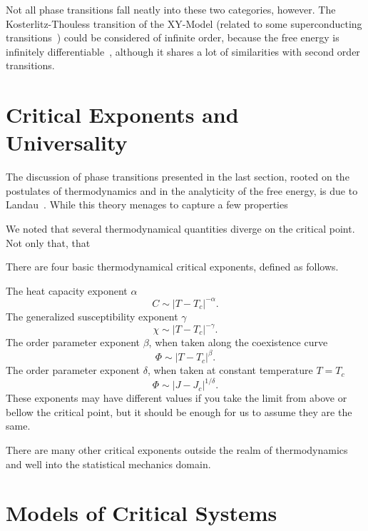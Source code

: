 Not all phase transitions fall neatly into these two categories, however. The
Kosterlitz-Thouless transition of the XY-Model (related to some superconducting
transitions~\cite{Resnick1981}) could be considered of infinite order, because
the free energy is infinitely differentiable~\cite{Kosterlitz1973}, although it
shares a lot of similarities with second order transitions.


\section{Critical Exponents and Universality}
\label{sec:universality}

The discussion of phase transitions presented in the last section, rooted on
the postulates of thermodynamics and in the analyticity of the free energy, is
due to Landau~\cite{Landau1969}. While this theory menages to capture a few
properties 

We noted that several thermodynamical quantities diverge on the critical point.
Not only that, that

There are four basic thermodynamical critical exponents, defined as follows.

The heat capacity exponent $\alpha$
\begin{equation}
    C \sim \left|T-T_c\right|^{-\alpha}.
\end{equation}
The generalized susceptibility exponent $\gamma$
\begin{equation}
    \chi \sim \left|T-T_c\right|^{-\gamma}.
\end{equation}
The order parameter exponent $\beta$, when taken along the coexistence curve 
\begin{equation}
    \Phi \sim {\left|T-T_c\right|}^{\beta}.
\end{equation}
The order parameter exponent $\delta$, when taken at constant temperature
$T=T_c$
\begin{equation}
    \Phi \sim \left|J-J_c\right|^{1/\delta}.
\end{equation}
These exponents may have different values if you take the limit from above or
bellow the critical point, but it should be enough for us to assume they are
the same.

There are many other critical exponents outside the realm of thermodynamics and
well into the statistical mechanics domain.


\section{Models of Critical Systems}
\label{sec:models}

